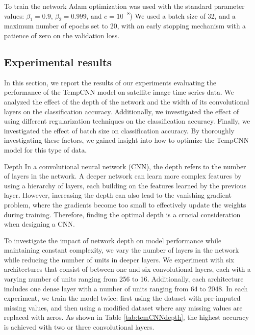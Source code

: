To train the network Adam optimization was used with the standard parameter values: $\beta_1 = 0.9$, $\beta_2 = 0.999$, and $e = 10^{-8}$) \cite{kingma2014adam} 
We used a batch size of 32, and a maximum number of epochs set to 20, with an early stopping mechanism with a patience of zero on the validation loss. 


\subsection{Experimental results}

In this section, we report the results of our experiments evaluating the performance of the TempCNN model on satellite image time series data.
We analyzed the effect of the depth of the network and the width of its convolutional layers on the classification accuracy.
Additionally, we investigated the effect of using different regularization techniques on the classification accuracy.
Finally, we investigated the effect of batch size on classification accuracy. 
By thoroughly investigating these factors, we gained insight into how to optimize the TempCNN model for this type of data.


\begin{paragraph}{Depth}
In a convolutional neural network (CNN), the depth refers to the number of layers in the network.
A deeper network can learn more complex features by using a hierarchy of layers, each building on the features learned by the previous layer.
However, increasing the depth can also lead to the vanishing gradient problem, where the gradients become too small to effectively update the weights during training.
Therefore, finding the optimal depth is a crucial consideration when designing a CNN.
\end{paragraph}

To investigate the impact of network depth on model performance while maintaining constant complexity, we vary the number of layers in the network while reducing the number of units in deeper layers.
We experiment with six architectures that consist of between one and six convolutional layers, each with a varying number of units ranging from 256 to 16.
Additionally, each architecture includes one dense layer with a number of units ranging from 64 to 2048. 
In each experiment, we train the model twice: first using the dataset with pre-imputed missing values, and then using a modified dataset where any missing values are replaced with zeros.
As shown in Table \ref{tab:temCNNdepth}, the highest accuracy is achieved with two or three convolutional layers.


